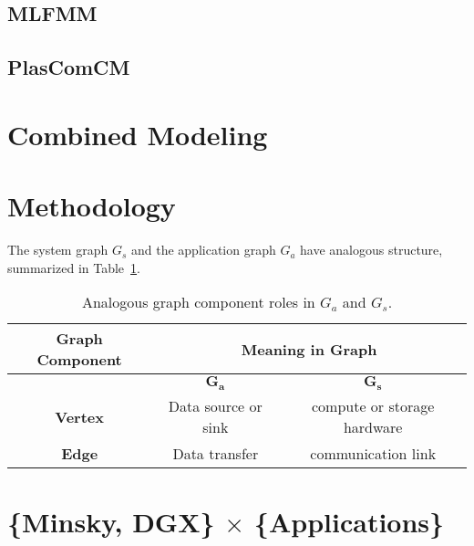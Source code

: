 \subsection{MLFMM}
\subsection{PlasComCM}

\section{Combined Modeling}
\label{sec:modeling}

\section{Methodology}

The system graph $G_s$ and the application graph $G_a$ have analogous structure, summarized in Table~\ref{tab:graph-comparison}.

\begin{table}[h]
    \centering
    \caption{Analogous graph component roles in $G_a$ and $G_s$.}
    \label{tab:graph-comparison}
    \begin{tabular}{|c|c|c|}
    \hline
    \textbf{Graph Component} & \multicolumn{2}{|c|}{\textbf{Meaning in Graph}}   \\ \hline
                             & $\bm{G_a}$    & $\bm{G_s}$                        \\ \hline \hline
    \textbf{Vertex}          & Data source or sink & compute or storage hardware \\ \hline
    \textbf{Edge}            & Data transfer & communication link                \\ \hline
    \end{tabular}
\end{table}



\section{\{Minsky, DGX\} $\times$ \{Applications\}}
